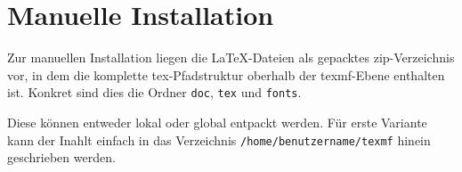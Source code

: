\section{Manuelle Installation}

Zur manuellen Installation liegen die LaTeX-Dateien als gepacktes
zip-Verzeichnis vor, in dem die komplette tex-Pfadstruktur oberhalb der
texmf-Ebene enthalten ist. Konkret sind dies die Ordner
\lstinline{doc}, \lstinline{tex} und \lstinline{fonts}.

Diese können entweder lokal oder global entpackt werden.
Für erste Variante kann der Inahlt einfach in das Verzeichnis
\lstinline{/home/benutzername/texmf} hinein geschrieben werden.

